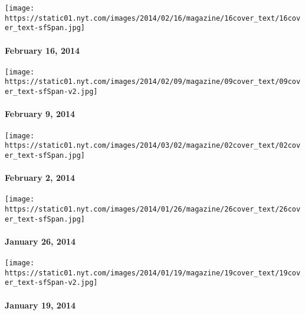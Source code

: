 \href{http://www.nytimes.com/indexes/2014/02/16/magazine/index.html}{}

\texttt{[image: https://static01.nyt.com/images/2014/02/16/magazine/16cover\_text/16cover\_text-sfSpan.jpg]}

\hypertarget{february-16-2014}{%
\paragraph{February 16, 2014}\label{february-16-2014}}

\href{http://www.nytimes.com/indexes/2014/02/09/magazine/index.html}{}

\texttt{[image: https://static01.nyt.com/images/2014/02/09/magazine/09cover\_text/09cover\_text-sfSpan-v2.jpg]}

\hypertarget{february-9-2014}{%
\paragraph{February 9, 2014}\label{february-9-2014}}

\href{http://www.nytimes.com/indexes/2014/02/02/magazine/index.html}{}

\texttt{[image: https://static01.nyt.com/images/2014/03/02/magazine/02cover\_text/02cover\_text-sfSpan.jpg]}

\hypertarget{february-2-2014}{%
\paragraph{February 2, 2014}\label{february-2-2014}}

\href{http://www.nytimes.com/indexes/2014/01/26/magazine/index.html}{}

\texttt{[image: https://static01.nyt.com/images/2014/01/26/magazine/26cover\_text/26cover\_text-sfSpan.jpg]}

\hypertarget{january-26-2014}{%
\paragraph{January 26, 2014}\label{january-26-2014}}

\href{http://www.nytimes.com/indexes/2014/01/19/magazine/index.html}{}

\texttt{[image: https://static01.nyt.com/images/2014/01/19/magazine/19cover\_text/19cover\_text-sfSpan-v2.jpg]}

\hypertarget{january-19-2014}{%
\paragraph{January 19, 2014}\label{january-19-2014}}

